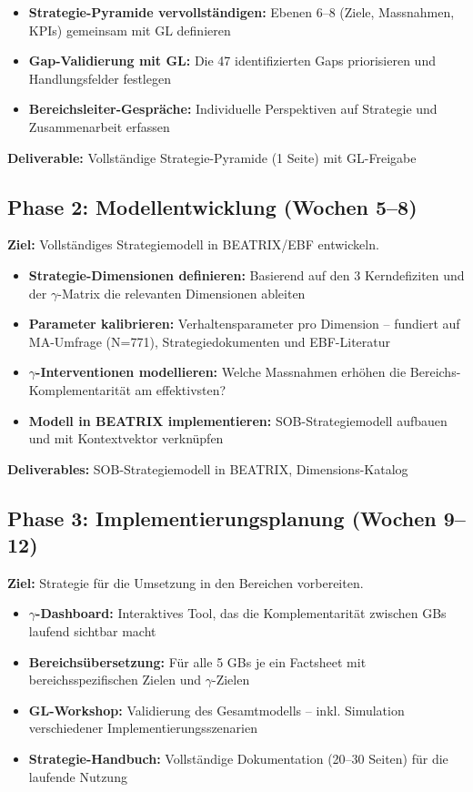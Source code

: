 \documentclass{fehradvice-report}
\begin{document}
\begin{itemize}
    \item \textbf{Strategie-Pyramide vervollständigen:} Ebenen 6--8 (Ziele, Massnahmen, KPIs) gemeinsam mit GL definieren
    \item \textbf{Gap-Validierung mit GL:} Die 47 identifizierten Gaps priorisieren und Handlungsfelder festlegen
    \item \textbf{Bereichsleiter-Gespräche:} Individuelle Perspektiven auf Strategie und Zusammenarbeit erfassen
\end{itemize}

\textbf{Deliverable:} Vollständige Strategie-Pyramide (1 Seite) mit GL-Freigabe

\subsection{Phase 2: Modellentwicklung (Wochen 5--8)}

\textbf{Ziel:} Vollständiges Strategiemodell in BEATRIX/EBF entwickeln.

\begin{itemize}
    \item \textbf{Strategie-Dimensionen definieren:} Basierend auf den 3 Kerndefiziten und der $\gamma$-Matrix die relevanten Dimensionen ableiten
    \item \textbf{Parameter kalibrieren:} Verhaltensparameter pro Dimension -- fundiert auf MA-Umfrage (N=771), Strategiedokumenten und EBF-Literatur
    \item \textbf{$\gamma$-Interventionen modellieren:} Welche Massnahmen erhöhen die Bereichs-Komplementarität am effektivsten?
    \item \textbf{Modell in BEATRIX implementieren:} SOB-Strategiemodell aufbauen und mit Kontextvektor verknüpfen
\end{itemize}

\textbf{Deliverables:} SOB-Strategiemodell in BEATRIX, Dimensions-Katalog

\subsection{Phase 3: Implementierungsplanung (Wochen 9--12)}

\textbf{Ziel:} Strategie für die Umsetzung in den Bereichen vorbereiten.

\begin{itemize}
    \item \textbf{$\gamma$-Dashboard:} Interaktives Tool, das die Komplementarität zwischen GBs laufend sichtbar macht
    \item \textbf{Bereichsübersetzung:} Für alle 5 GBs je ein Factsheet mit bereichsspezifischen Zielen und $\gamma$-Zielen
    \item \textbf{GL-Workshop:} Validierung des Gesamtmodells -- inkl. Simulation verschiedener Implementierungsszenarien
    \item \textbf{Strategie-Handbuch:} Vollständige Dokumentation (20--30 Seiten) für die laufende Nutzung
\end{itemize}
\end{document}
